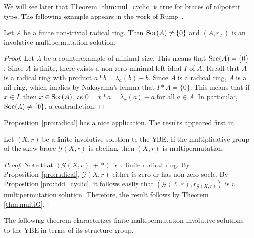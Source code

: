 We will see later that Theorem~\ref{thm:mul_cyclic}
is true for braces of nilpotent type. 
The following example appears in the work of Rump~\cite{MR2278047}.

\begin{proposition}
\label{pro:radical}
Let $A$ be a finite non-trivial radical ring. Then $\operatorname{Soc}(A)\ne\{0\}$ and 
$(A,r_A)$ is an involutive multipermutation solution. 
\end{proposition}

\begin{proof}
Let $A$ be a counterexample of minimal size. This means that $\operatorname{Soc}(A)=\{0\}$. 
Since $A$ is finite, there exists a non-zero minimal left ideal $I$ of $A$.
Recall that $A$ is a radical ring with product $a*b=\lambda_a(b)-b$. 
Since $A$ is a radical ring, $A$ is a nil ring, which implies by 
Nakayama's lemma that $I*A=\{0\}$. This means that if $x\in I$, 
then $x\in\operatorname{Soc}(A)$, as $0=x*a=\lambda_x(a)-a$ for all $a\in A$. 
In particular, $\operatorname{Soc}(A)\ne\{0\}$, a contradiction. 
\end{proof}

Proposition~\ref{pro:radical} has a nice application. The results appeared first in~\cite{MR3177933}. 

\begin{theorem}
\label{thm:CJO_abelian}
    Let $(X,r)$ be a finite involutive solution to the YBE. If the multiplicative group of the skew brace 
    $\mathcal{G}(X,r)$ is abelian, then $(X,r)$ is multipermutation. 
\end{theorem}

\begin{proof}
    Note that $(\mathcal{G}(X,r), +,*)$ is a finite radical ring. By Proposition~\ref{pro:radical}, $\mathcal{G}(X,r)$  either is zero or has non-zero socle. By Proposition \ref{pro:add_cyclic}, it follows easily that     
    $\left(\mathcal{G}(X,r),r_{\mathcal{G}(X,r)}\right)$ is a multipermutation solution. Therefore, the result follows by Theorem \ref{thm:multiG}.
\end{proof}







The following theorem characterizes finite multipermutation involutive solutions to the YBE in 
terms of its structure group. 

